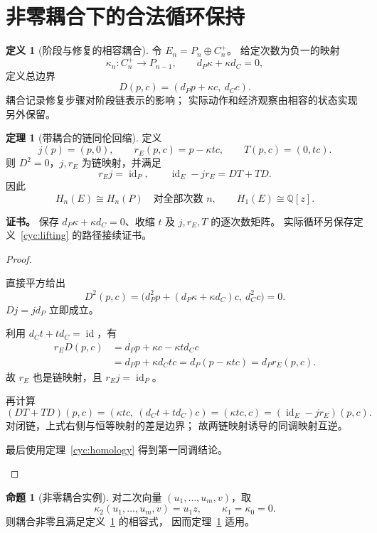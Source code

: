 \documentclass[UTF8,12pt,a4paper,openany,fontset=none,zihao=false]{ctexrep}
\theoremstyle{definition}
\newtheorem{definition}{定义}[chapter]
\newtheorem{theorem}{定理}[chapter]
\newtheorem{proposition}{命题}[chapter]
\newenvironment{certificate}{\par\noindent\textbf{证书。}\ignorespaces}{\par}
\newcommand{\1}{\mathbf 1}
\begin{document}
\section{非零耦合下的合法循环保持}
\begin{definition}[阶段与修复的相容耦合]
\label{cyc:coupling}
令 \(E_n=P_n\oplus C_n^+\)。
给定次数为负一的映射
\[
\kappa_n:C_n^+\to P_{n-1},
\qquad d_P\kappa+\kappa d_C=0,
\]
定义总边界
\[
D(p,c)=(d_Pp+\kappa c,\ d_Cc).
\]
耦合记录修复步骤对阶段链表示的影响；
实际动作和经济观察由相容的状态实现另外保留。
\end{definition}
\begin{theorem}[带耦合的链同伦回缩]
\label{cyc:retraction}
定义
\[
j(p)=(p,0),\qquad
r_E(p,c)=p-\kappa tc,\qquad
T(p,c)=(0,tc).
\]
则 \(D^2=0\)，\(j,r_E\) 为链映射，并满足
\[
r_Ej=\operatorname{id}_P,\qquad
\operatorname{id}_E-jr_E=DT+TD.
\]
因此
\[
H_n(E)\cong H_n(P)
\quad\text{对全部次数 }n,
\qquad H_1(E)\cong\mathbb Q[z].
\]
\end{theorem}
\begin{certificate}
保存 \(d_P\kappa+\kappa d_C=0\)、收缩 \(t\)
及 \(j,r_E,T\) 的逐次数矩阵。
实际循环另保存定义~\ref{cyc:lifting} 的路径接续证书。
\end{certificate}
\begin{proof}
\begin{semanticsteps}
\item 直接平方给出
\[
D^2(p,c)=
\bigl(d_P^2p+(d_P\kappa+\kappa d_C)c,\ d_C^2c\bigr)=0.
\]
\(Dj=jd_P\) 立即成立。
\item 利用 \(d_Ct+td_C=\operatorname{id}\)，有
\[
\begin{aligned}
r_ED(p,c)
&=d_Pp+\kappa c-\kappa td_Cc\\
&=d_Pp+\kappa d_Ctc
=d_P(p-\kappa tc)
=d_Pr_E(p,c).
\end{aligned}
\]
故 \(r_E\) 也是链映射，且 \(r_Ej=\operatorname{id}_P\)。
\item 再计算
\[
(DT+TD)(p,c)
=(\kappa tc,\ (d_Ct+td_C)c)
=(\kappa tc,c)
=(\operatorname{id}_E-jr_E)(p,c).
\]
对闭链，上式右侧与恒等映射的差是边界；
故两链映射诱导的同调映射互逆。
\item 最后使用定理~\ref{cyc:homology} 得到第一同调结论。
\end{semanticsteps}
\end{proof}
\begin{proposition}[非零耦合实例]
\label{cyc:nonzero}
对二次向量 \((u_1,\ldots,u_m,v)\)，取
\[
\kappa_2(u_1,\ldots,u_m,v)=u_1z,\qquad
\kappa_1=\kappa_0=0.
\]
则耦合非零且满足定义~\ref{cyc:coupling} 的相容式，
因而定理~\ref{cyc:retraction} 适用。
\end{proposition}
\end{document}
